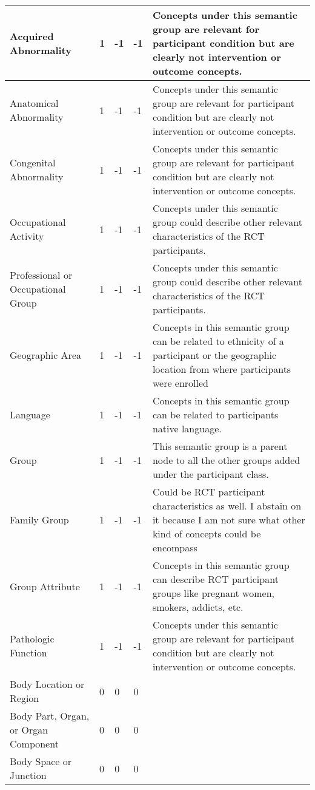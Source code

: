\documentclass[10.7pt,]{article}
\begin{document}
\begin{longtable}{|l|p{0.3cm}|p{0.3cm}|p{0.3cm}|p{7.9cm}|}
        Acquired Abnormality & 1 & -1 & -1 & Concepts under this semantic group are relevant for participant condition but are clearly not intervention or outcome concepts. \\ \hline
        Anatomical Abnormality & 1 & -1 & -1 & Concepts under this semantic group are relevant for participant condition but are clearly not intervention or outcome concepts. \\ \hline
        Congenital Abnormality & 1 & -1 & -1 & Concepts under this semantic group are relevant for participant condition but are clearly not intervention or outcome concepts. \\ \hline
        Occupational Activity & 1 & -1 & -1 & Concepts under this semantic group could describe other relevant characteristics of the RCT participants. \\ \hline
        Professional or Occupational Group & 1 & -1 & -1 & Concepts under this semantic group could describe other relevant characteristics of the RCT participants. \\ \hline
        Geographic Area & 1 & -1 & -1 & Concepts in this semantic group can be related to ethnicity of a participant or the geographic location from where participants were enrolled \\ \hline
        Language & 1 & -1 & -1 & Concepts in this semantic group can be related to participants native language. \\ \hline
        Group & 1 & -1 & -1 & This semantic group is a parent node to all the other groups added under the participant class. \\ \hline
        Family Group & 1 & -1 & -1 & Could be RCT participant characteristics as well. I abstain on it because I am not sure what other kind of concepts could be encompass \\ \hline
        Group Attribute & 1 & -1 & -1 & Concepts in this semantic group can describe RCT participant groups like pregnant women, smokers, addicts, etc. \\ \hline
        Pathologic Function & 1 & -1 & -1 & Concepts under this semantic group are relevant for participant condition but are clearly not intervention or outcome concepts. \\ \hline
        Body Location or Region & 0 & 0 & 0 & ~ \\ \hline
        Body Part, Organ, or Organ Component & 0 & 0 & 0 & ~ \\ \hline
        Body Space or Junction & 0 & 0 & 0 & ~ \\ \hline

\end{longtable}
\end{document}
